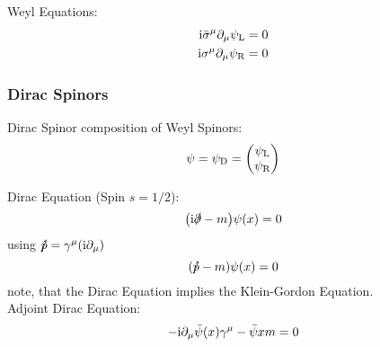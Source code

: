 			\noindent
			Weyl Equations:
			\begin{equation}
				\begin{aligned}
					\mathrm{i} \bar{\sigma}^\mu \partial_\mu \psi_\text{L} &= 0 \\
					\mathrm{i} \sigma^\mu \partial_\mu \psi_\text{R} &= 0 \\
				\end{aligned}
			\end{equation}
			
		\subsubsection{Dirac Spinors}
			Dirac Spinor composition of Weyl Spinors:
			\begin{equation}
				\psi = \psi_\text{D} = \mqty(\psi_\text{L} \\ \psi_\text{R})
			\end{equation}
			
			\noindent
			Dirac Equation (Spin $s=1/2$):
			\begin{equation}
				\qty(\mathrm{i}\slashed{\partial} - m ) \psi\qty(x) = 0
			\end{equation}
			using $\slashed{\hat{p}} = \gamma^\mu(\mathrm{i}\partial_\mu)$
			\begin{equation}
				\qty(\slashed{\hat{p}} - m) \psi\qty(x) = 0
			\end{equation}
			note, that the Dirac Equation implies the Klein-Gordon Equation.\\	

			\noindent
			Adjoint Dirac Equation:
			\begin{equation}
				-\mathrm{i} \partial_\mu \bar{\psi}(x)\gamma^\mu-\bar\psi{x}m = 0
			\end{equation}

